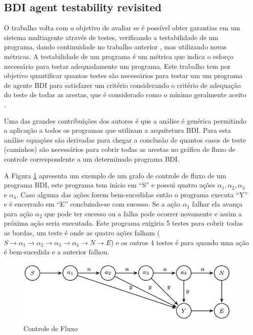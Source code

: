 \documentclass[dm,ppgcomp]{texfurg} %
\begin{document}
\subsection{BDI agent testability revisited}

O trabalho \cite{winikoff2017bdi} volta com o objetivo de avaliar se é possível obter garantias em um sistema multiagente através de testes, verificando a testabilidade de um programa, dando continuidade no trabalho anterior \cite{winikoff2014testability}, mas utilizando novas métricas. A testabilidade de um programa é um métrica que indica o esforço necessário para testar adequadamente um programa. Este trabalho tem por objetivo quantificar quantos testes são necessários para testar um um programa de agente BDI para satisfazer um critério considerando o critério de adequação do teste de todas as arestas, que é considerado como o mínimo geralmente aceito \cite{jorgensen2016software}. 

Uma das grandes contribuições dos autores é que a  análise é genérica permitindo a aplicação a todos os programas que utilizam a arquitetura BDI. Para esta análise equações são derivadas  para chegar a conclusão de quantos casos de teste (caminhos) são necessários para cobrir todas as arestas no gráfico de fluxo de controle correspondente a um determinado programa BDI.

A Figura \ref{fig:control_fluxo} apresenta um exemplo de um grafo de controle de fluxo de um programa BDI, este programa tem início em “S” e possui quatro ações $\alpha_{1}, \alpha_{2}, \alpha_{3}$ e $\alpha_{4}$. Caso alguma das ações forem bem-sucedidas então o programa executa “Y” e é encerrado em “E” concluindo-se com sucesso. Se a ação $\alpha_{1}$ falhar ela avança para ação $\alpha_{2}$ que pode ter sucesso ou a falha pode ocorrer novamente e assim a próxima ação seria executada. Este programa exigiria 5 testes para cobrir todas as bordas, um teste é onde as quatro ações falham ($S \rightarrow \alpha_{1} \rightarrow \alpha_{2} \rightarrow \alpha_{3} \rightarrow \alpha_{4} \rightarrow N \rightarrow E$) e os outros 4 testes é para quando uma ação é bem-sucedida e a anterior falhou.

\begin{figure}[ht]
\centering
\includegraphics[scale=0.5]{imagens/control_flow.png}
\caption{Controle de Fluxo}
\label{fig:control_fluxo}
\end{figure}
\end{document}
